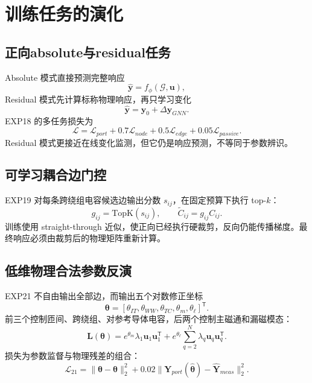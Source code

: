 \documentclass[UTF8,11pt,a4paper]{ctexart}
\newcommand{\mat}[1]{\bm{#1}}
\newcommand{\vect}[1]{\bm{#1}}
\begin{document}
\section{训练任务的演化}

\subsection{正向absolute与residual任务}
Absolute 模式直接预测完整响应
\begin{equation}
\widehat{\vect y}=f_\phi(\mathcal G,\vect u),
\end{equation}
Residual 模式先计算标称物理响应，再只学习变化
\begin{equation}
\widehat{\vect y}=\vect y_0+\Delta\widehat{\vect y}_{GNN}.
\end{equation}
EXP18 的多任务损失为
\begin{equation}
\mathcal L=\mathcal L_{port}+0.7\mathcal L_{node}+0.5\mathcal L_{edge}
+0.05\mathcal L_{passive}.
\end{equation}
Residual 模式更接近在线变化监测，但它仍是响应预测，不等同于参数辨识。

\subsection{可学习耦合边门控}
EXP19 对每条跨绕组电容候选边输出分数 $s_{ij}$，在固定预算下执行 top-$k$：
\begin{equation}
g_{ij}=\mathrm{TopK}(s_{ij}),\qquad \widetilde C_{ij}=g_{ij}C_{ij}.
\end{equation}
训练使用 straight-through 近似，使正向已经执行硬裁剪，反向仍能传播梯度。最终响应必须由裁剪后的物理矩阵重新计算。

\subsection{低维物理合法参数反演}
EXP21 不自由输出全部边，而输出五个对数修正坐标
\begin{equation}
\vect\theta=[\theta_{IT},\theta_{WW},\theta_{TC},\theta_m,\theta_\ell]^{\mathsf T}.
\end{equation}
前三个控制匝间、跨绕组、对参考导体电容，后两个控制主磁通和漏磁模态：
\begin{equation}
\mat L(\vect\theta)=e^{\theta_m}\lambda_1\vect u_1\vect u_1^{\mathsf T}
+e^{\theta_\ell}\sum_{q=2}^{N}\lambda_q\vect u_q\vect u_q^{\mathsf T}.
\end{equation}
损失为参数监督与物理残差的组合：
\begin{equation}
\mathcal L_{21}=\|\widehat{\vect\theta}-\vect\theta\|_2^2
+0.02\|\mat Y_{port}(\widehat{\vect\theta})-\widehat{\mat Y}_{meas}\|_2^2.
\end{equation}
\end{document}
